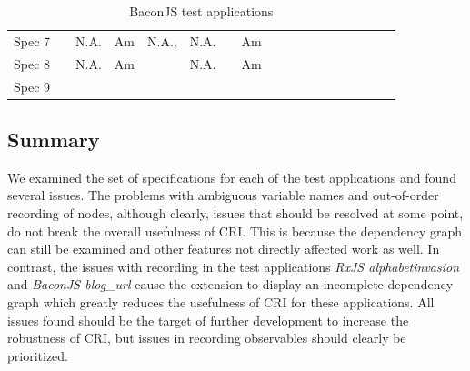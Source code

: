\begin{table}[]
{\begin{tabular}{llllllllllllllllll}
		Spec 7 & \myes         & N.A.       & Am       & N.A.,\myes & N.A.       & \myes                                 & Am                   & \myes                 & \myes               & \myes               & \myes            & \myes         & \myes                   & \myes                & \myes                 & \myes       & \myes \\
		Spec 8 & \myes         & N.A.       & Am       & \myes      & N.A.       & \mno                                 & Am                   & \myes                 & \myes               & \myes               & \myes            & \mno         & \myes                   & \myes                & \myes                 & \myes       & \myes \\
		Spec 9 & \myes         & \myes         & \myes        & \myes      & \myes         & \myes                                 & \myes                    & \myes                 & \myes               & \myes               & \myes            & \myes         & \myes                   & \myes                & \myes                 & \myes       & \myes
	\end{tabular}%
}
\caption{BaconJS test applications}
\label{tab:BaconJS}
\end{table}

\subsection{Summary}
We examined the set of specifications for each of the test applications and found several issues. The problems with ambiguous variable names and out-of-order recording of nodes, although clearly, issues that should be resolved at some point, do not break the overall usefulness of CRI. This is because the dependency graph can still be examined and other features not directly affected work as well. %
 In contrast, the issues with recording in the test applications \emph{RxJS alphabetinvasion} and \emph{BaconJS blog\_url} cause the extension to display an incomplete dependency graph which greatly reduces the usefulness of CRI for these applications.
All issues found should be the target of further development to increase the robustness of CRI, but issues in recording observables should clearly be prioritized.